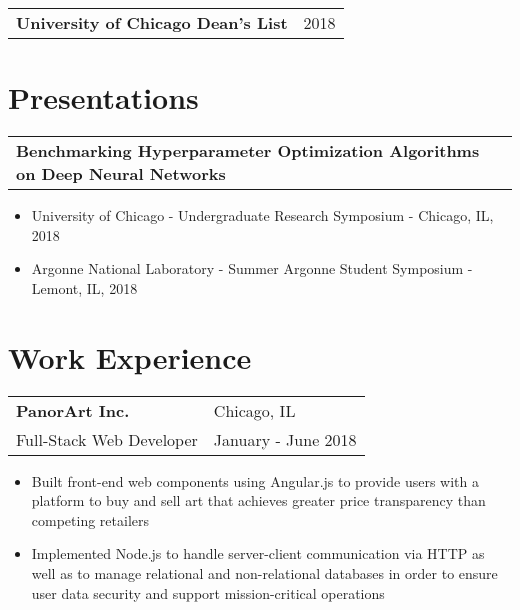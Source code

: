 \documentclass[letterpaper, 12pt]{article}
\begin{document}
\begin{tabular}{@{} L{12cm} @{} R{4.51cm} @{}}
  \textbf{University of Chicago Dean's List} & 2018 \\
\end{tabular}

\section{Presentations}
\vspace{10pt}
\begin{tabular}{@{} L{12cm} @{} R{4.51cm} @{}}
  \textbf{Benchmarking Hyperparameter Optimization Algorithms on Deep Neural Networks} & \\
\end{tabular}
\vspace{-10pt}
\begin{itemize}
  \item University of Chicago - Undergraduate Research Symposium - Chicago, IL, 2018
  \item Argonne National Laboratory - Summer Argonne Student Symposium - Lemont, IL, 2018
\end{itemize}

\section{Work Experience}
\vspace{10pt}
\begin{tabular}{@{} L{12cm} @{} R{4.51cm} @{}}
  \textbf{PanorArt Inc.} & Chicago, IL \\
  Full-Stack Web Developer & January - June 2018 \\
\end{tabular}
\vspace{-10pt}
\begin{itemize}
  \item Built front-end web components using Angular.js to provide users with a platform to buy and sell art that achieves greater price transparency than competing retailers
  \item Implemented Node.js to handle server-client communication via HTTP as well as to manage relational and non-relational databases in order to ensure user data security and support mission-critical operations
\end{itemize}
\end{document}
